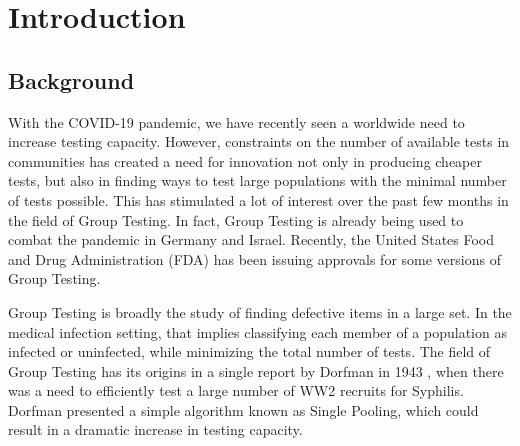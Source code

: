 \documentclass[12pt]{article}
\begin{document}

\section{Introduction}

\subsection{Background}
 

With the COVID-19 pandemic, we have recently seen a worldwide need to increase testing capacity. However, constraints on the number of available tests in communities has created a need for innovation not only in producing cheaper tests, but also in finding ways to test large populations with the minimal number of tests possible. This has stimulated a lot of interest over the past few months in the field of Group Testing. In fact, Group Testing is already being used to combat the pandemic in Germany and Israel. Recently, the United States Food and Drug Administration (FDA) has been issuing approvals for some versions of Group Testing.

Group Testing is broadly the study of finding defective items in a large set. In the medical infection setting, that implies classifying each member of a population as infected or uninfected, while minimizing the total number of tests. The field of Group Testing has its origins in a single report by Dorfman in 1943 \cite{D1943}, when there was a need to efficiently test a large number of WW2 recruits for Syphilis. Dorfman presented a simple algorithm known as Single Pooling, which could result in a dramatic increase in testing capacity.
\end{document}
